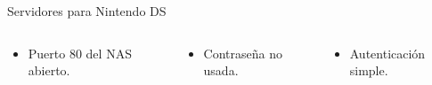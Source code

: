\begin{frame}{Servidores para Nintendo DS}

\begin{center}
\end{center}

\begin{columns}
\footnotesize
\begin{column}{0.3333\textwidth}
    \begin{itemize}
        \item<4-> Puerto 80 del NAS abierto.
    \end{itemize}
\end{column}
\begin{column}{0.3333\textwidth}
    \begin{itemize}
        \item<5-> Contraseña no usada.
    \end{itemize}
\end{column}
\begin{column}{0.3333\textwidth}
    \begin{itemize}
        \item<6-> Autenticación simple.
    \end{itemize}
\end{column}

\end{columns}
\end{frame}

